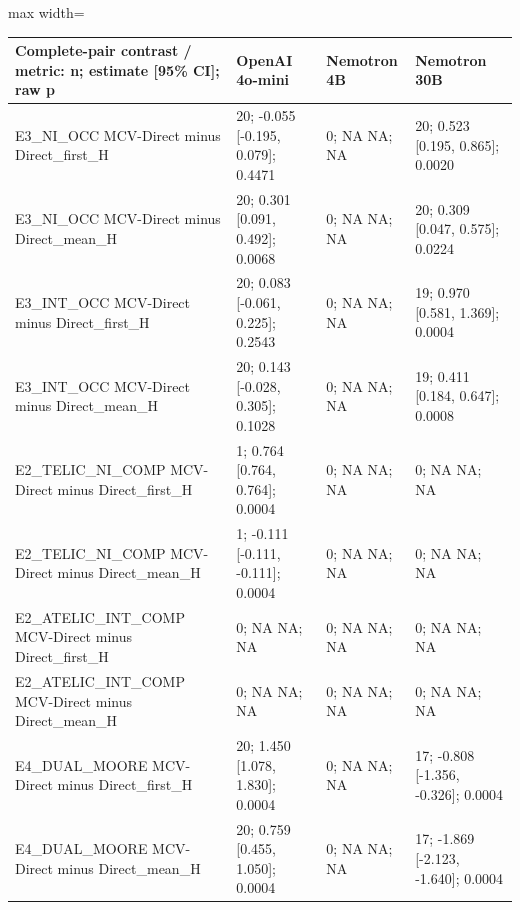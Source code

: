 \documentclass[11pt,a4paper]{article}
\begin{document}
\begin{center}\begingroup\small\setlength{\tabcolsep}{4.5pt}\renewcommand{\arraystretch}{1.12}\begin{adjustbox}{max width=\textwidth}\begin{tabular}{llll}\toprule
\textbf{Complete-pair contrast / metric: n; estimate [95\% CI]; raw p} & \textbf{OpenAI 4o-mini} & \textbf{Nemotron 4B} & \textbf{Nemotron 30B} \\ \midrule
E3\_\allowbreak{}NI\_\allowbreak{}OCC MCV-Direct minus Direct\_\allowbreak{}first\_\allowbreak{}H & 20; -0.055 [-0.195, 0.079]; 0.4471 & 0; NA NA; NA & 20; 0.523 [0.195, 0.865]; 0.0020 \\
E3\_\allowbreak{}NI\_\allowbreak{}OCC MCV-Direct minus Direct\_\allowbreak{}mean\_\allowbreak{}H & 20; 0.301 [0.091, 0.492]; 0.0068 & 0; NA NA; NA & 20; 0.309 [0.047, 0.575]; 0.0224 \\
E3\_\allowbreak{}INT\_\allowbreak{}OCC MCV-Direct minus Direct\_\allowbreak{}first\_\allowbreak{}H & 20; 0.083 [-0.061, 0.225]; 0.2543 & 0; NA NA; NA & 19; 0.970 [0.581, 1.369]; 0.0004 \\
E3\_\allowbreak{}INT\_\allowbreak{}OCC MCV-Direct minus Direct\_\allowbreak{}mean\_\allowbreak{}H & 20; 0.143 [-0.028, 0.305]; 0.1028 & 0; NA NA; NA & 19; 0.411 [0.184, 0.647]; 0.0008 \\
E2\_\allowbreak{}TELIC\_\allowbreak{}NI\_\allowbreak{}COMP MCV-Direct minus Direct\_\allowbreak{}first\_\allowbreak{}H & 1; 0.764 [0.764, 0.764]; 0.0004 & 0; NA NA; NA & 0; NA NA; NA \\
E2\_\allowbreak{}TELIC\_\allowbreak{}NI\_\allowbreak{}COMP MCV-Direct minus Direct\_\allowbreak{}mean\_\allowbreak{}H & 1; -0.111 [-0.111, -0.111]; 0.0004 & 0; NA NA; NA & 0; NA NA; NA \\
E2\_\allowbreak{}ATELIC\_\allowbreak{}INT\_\allowbreak{}COMP MCV-Direct minus Direct\_\allowbreak{}first\_\allowbreak{}H & 0; NA NA; NA & 0; NA NA; NA & 0; NA NA; NA \\
E2\_\allowbreak{}ATELIC\_\allowbreak{}INT\_\allowbreak{}COMP MCV-Direct minus Direct\_\allowbreak{}mean\_\allowbreak{}H & 0; NA NA; NA & 0; NA NA; NA & 0; NA NA; NA \\
E4\_\allowbreak{}DUAL\_\allowbreak{}MOORE MCV-Direct minus Direct\_\allowbreak{}first\_\allowbreak{}H & 20; 1.450 [1.078, 1.830]; 0.0004 & 0; NA NA; NA & 17; -0.808 [-1.356, -0.326]; 0.0004 \\
E4\_\allowbreak{}DUAL\_\allowbreak{}MOORE MCV-Direct minus Direct\_\allowbreak{}mean\_\allowbreak{}H & 20; 0.759 [0.455, 1.050]; 0.0004 & 0; NA NA; NA & 17; -1.869 [-2.123, -1.640]; 0.0004 \\

\end{tabular}
\end{adjustbox}
\end{center}
\end{document}
